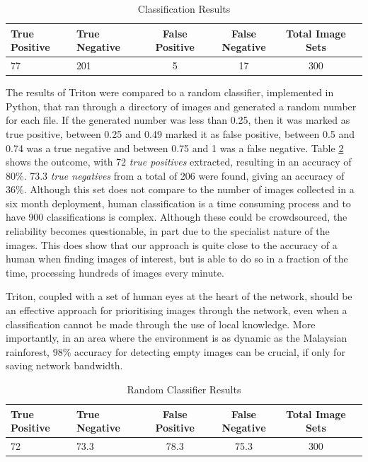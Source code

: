 		\begin{footnotesize}
		\begin{table}
		\centering
			\hfill{}
			\begin{tabular}{|l|l|c|c|c|c|}
				\hline
					True Positive & True Negative & False Positive  & False Negative & Total Image Sets \\
				\hline
					77 & 201 & 5 & 17 & 300 \\
				\hline
			\end{tabular}
			\hfill{}
			\caption{Classification Results}
			\label{table:processing}
		\end{table}
		\end{footnotesize}
		
		The results of Triton were compared to a random classifier, implemented in Python, that ran through a directory of images and generated a random number for each file. If the generated number was less than 0.25, then it was marked as true positive, between 0.25 and 0.49 marked it as false positive, between 0.5 and 0.74 was a true negative and between 0.75 and 1 was a false negative. Table \ref{table:random} shows the outcome, with 72 \textit{true positives} extracted, resulting in an accuracy of 80\%. 73.3 \textit{true negatives} from a total of 206 were found, giving an accuracy of 36\%. Although this set does not compare to the number of images collected in a six month deployment, human classification is a time consuming process and to have 900 classifications is complex. Although these could be crowdsourced, the reliability becomes questionable, in part due to the specialist nature of the images. This does show that our approach is quite close to the accuracy of a human when finding images of interest, but is able to do so in a fraction of the time, processing hundreds of images every minute. 
		
		Triton, coupled with a set of human eyes at the heart of the network, should be an effective approach for prioritising images through the network, even when a classification cannot be made through the use of local knowledge. More importantly, in an area where the environment is as dynamic as the Malaysian rainforest, 98\% accuracy for detecting empty images can be crucial, if only for saving network bandwidth.
		
		\begin{footnotesize}
		\begin{table}
		\centering
			\hfill{}
			\begin{tabular}{|l|l|c|c|c|c|}
				\hline
					True Positive & True Negative & False Positive  & False Negative & Total Image Sets \\
				\hline
					72 & 73.3 & 78.3 & 75.3 & 300 \\
				\hline
			\end{tabular}
			\hfill{}
			\caption{Random Classifier Results}
			\label{table:random}
		\end{table}		
		\end{footnotesize}	
%	
